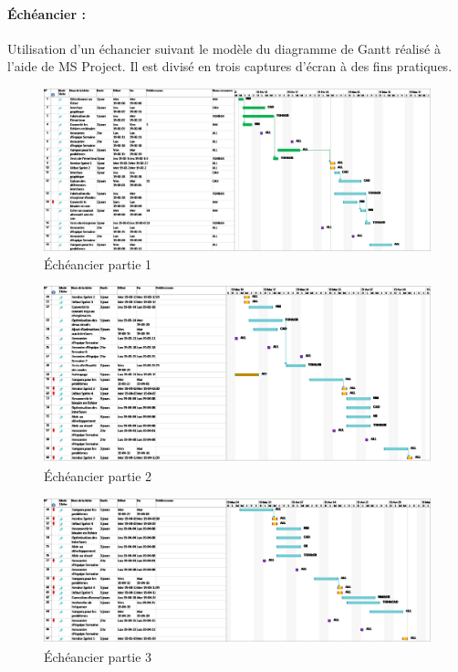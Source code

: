 \paragraph{Échéancier :}
Utilisation d'un échancier suivant le modèle du diagramme de Gantt réalisé à l'aide de MS Project. Il est divisé en trois captures d'écran à des fins pratiques.

\begin{figure}[ht!]
    \centering
    \caption{Échéancier partie 1}
    \includegraphics[width=0.8\linewidth]{images/echeancier/echeancier_Sprint_2_part1.png}
\end{figure}

\begin{figure}[ht!]
    \centering
    \caption{Échéancier partie 2}
    \includegraphics[width=0.8\linewidth]{images/echeancier/echeancier_Sprint_2_part2.png}
\end{figure}

\begin{figure}[ht!]
    \centering
    \caption{Échéancier partie 3}
    \includegraphics[width=0.8\linewidth]{images/echeancier/echeancier_Sprint_2_part3.png}
\end{figure}